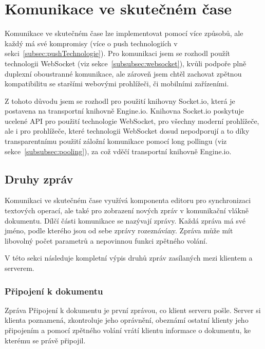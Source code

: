 
\section{Komunikace ve skutečném čase}\label{sec:komunikaceVeSkutečnémČase}

Komunikace ve skutečném čase lze implementovat pomocí více způsobů, ale každý má své kompromisy (více o push technologiích v sekci~\ref{subsec:pushTechnologie}).
Pro komunikaci jsem se rozhodl použít technologii WebSocket (viz sekce~\ref{subsubsec:websocket}), kvůli podpoře plně duplexní oboustranné komunikace, ale zároveň jsem chtěl zachovat zpětnou kompatibilitu se staršími webovými prohlížeči, či mobilními zařízeními.

Z tohoto důvodu jsem se rozhodl pro použití knihovny Socket.io, která je postavena na transportní knihovně Engine.io.
Knihovna Socket.io poskytuje ucelené \gls{API} pro použití technologie WebSocket, pro všechny moderní prohlížeče, ale i pro prohlížeče, které technologii WebSocket dosud nepodporují a to díky transparentnímu použití záložní komunikace pomocí long pollingu (viz sekce~\ref{subsubsec:pooling}), za což vděčí transportní knihovně Engine.io.

\subsection{Druhy zpráv}\label{subsec:druhyZprávyVeSkutečnémČase}

Komunikaci ve skutečném čase využívá komponenta editoru pro synchronizaci textových operací, ale také pro zobrazení nových zpráv v komunikační vlákně dokumentu.
Dílčí části komunikace se nazývají zprávy.
Každá zpráva má své jméno, podle kterého jsou od sebe zprávy rozeznávány.
Zpráva může mít libovolný počet parametrů a nepovinnou funkci zpětného volání.

V této sekci následuje kompletní výpis druhů zpráv zasílaných mezi klientem a serverem.

\subsubsection{Připojení k dokumentu} %

Zpráva Připojení k dokumentu je první zprávou, co klient serveru pošle.
Server si klienta poznamená, zkontroluje jeho oprávnění, obeznámí ostatní klienty jeho připojením a pomocí zpětného volání vrátí klientu informace o dokumentu, ke kterému se právě připojil.

